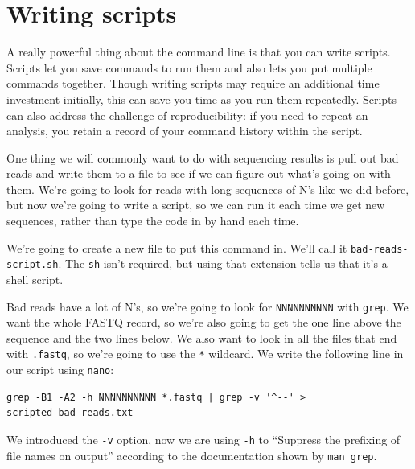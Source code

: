 \documentclass[
  letterpaper,
  DIV=11,
  numbers=noendperiod]{scrreprt}
\newenvironment{Shaded}{\begin{snugshade}}{\end{snugshade}}
\newcommand{\ExtensionTok}[1]{\textcolor[rgb]{0.00,0.23,0.31}{#1}}
\newcommand{\NormalTok}[1]{\textcolor[rgb]{0.00,0.23,0.31}{#1}}
\begin{document}
\section{\texorpdfstring{\textbf{Writing
scripts}}{Writing scripts}}\label{writing-scripts}

A really powerful thing about the command line is that you can write
scripts. Scripts let you save commands to run them and also lets you put
multiple commands together. Though writing scripts may require an
additional time investment initially, this can save you time as you run
them repeatedly. Scripts can also address the challenge of
reproducibility: if you need to repeat an analysis, you retain a record
of your command history within the script.

One thing we will commonly want to do with sequencing results is pull
out bad reads and write them to a file to see if we can figure out
what's going on with them. We're going to look for reads with long
sequences of N's like we did before, but now we're going to write a
script, so we can run it each time we get new sequences, rather than
type the code in by hand each time.

We're going to create a new file to put this command in. We'll call it
\texttt{bad-reads-script.sh}. The \texttt{sh} isn't required, but using
that extension tells us that it's a shell script.

\begin{Shaded}
\end{Shaded}

Bad reads have a lot of N's, so we're going to look for
\texttt{NNNNNNNNNN} with \texttt{grep}. We want the whole FASTQ record,
so we're also going to get the one line above the sequence and the two
lines below. We also want to look in all the files that end with
\texttt{.fastq}, so we're going to use the \texttt{*} wildcard. We write
the following line in our script using \texttt{nano}:

\begin{verbatim}
grep -B1 -A2 -h NNNNNNNNNN *.fastq | grep -v '^--' > scripted_bad_reads.txt
\end{verbatim}

\begin{tcolorbox}[enhanced jigsaw, opacitybacktitle=0.6, colback=white, coltitle=black, opacityback=0, rightrule=.15mm, toptitle=1mm, toprule=.15mm, bottomtitle=1mm, colframe=quarto-callout-note-color-frame, arc=.35mm, titlerule=0mm, colbacktitle=quarto-callout-note-color!10!white, leftrule=.75mm, title=\textcolor{quarto-callout-note-color}{\faInfo}\hspace{0.5em}{Note}, breakable, bottomrule=.15mm, left=2mm]

We introduced the \texttt{-v} option, now we are using \texttt{-h} to
``Suppress the prefixing of file names on output'' according to the
documentation shown by \texttt{man\ grep}.

\end{tcolorbox}
\end{document}
